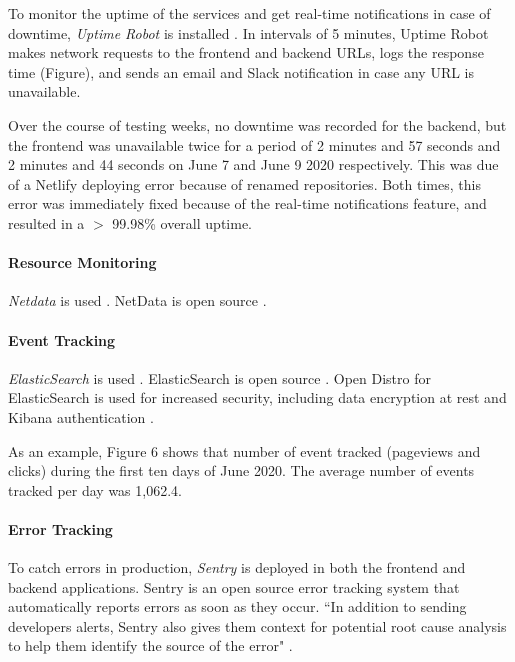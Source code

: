 \documentclass{article}
\begin{document}
To monitor the uptime of the services and get real-time notifications in case of downtime, \emph{Uptime Robot} is installed \cite{noauthor_about_nodate}. In intervals of 5 minutes, Uptime Robot makes network requests to the frontend and backend URLs, logs the response time (Figure), and sends an email and Slack notification in case any URL is unavailable.

Over the course of testing weeks, no downtime was recorded for the backend, but the frontend was unavailable twice for a period of 2 minutes and 57 seconds and 2 minutes and 44 seconds on June 7 and June 9 2020 respectively. This was due of a Netlify deploying error because of renamed repositories. Both times, this error was immediately fixed because of the real-time notifications feature, and resulted in a $>$ 99.98\% overall uptime.

\paragraph{Resource Monitoring}

\emph{Netdata} is used \cite{noauthor_netdata_nodate}. NetData is open source \cite{noauthor_netdata/netdata_2020}.

\paragraph{Event Tracking}

\emph{ElasticSearch} is used \cite{noauthor_elastic_nodate}. ElasticSearch is open source \cite{noauthor_elastic/elasticsearch_2020}. Open Distro for ElasticSearch is used for increased security, including data encryption at rest and Kibana authentication \cite{noauthor_open_nodate}.

As an example, Figure 6 shows that number of event tracked (pageviews and clicks) during the first ten days of June 2020. The average number of events tracked per day was 1,062.4.

\paragraph{Error Tracking}

To catch errors in production, \emph{Sentry} is deployed in both the frontend and backend applications. Sentry is an open source error tracking system \cite{noauthor_sentry_nodate} that automatically reports errors as soon as they occur. ``In addition to sending developers alerts, Sentry also gives them context for potential root cause analysis to help them identify the source of the error" \cite{noauthor_sentry_nodate-1}.
\end{document}
